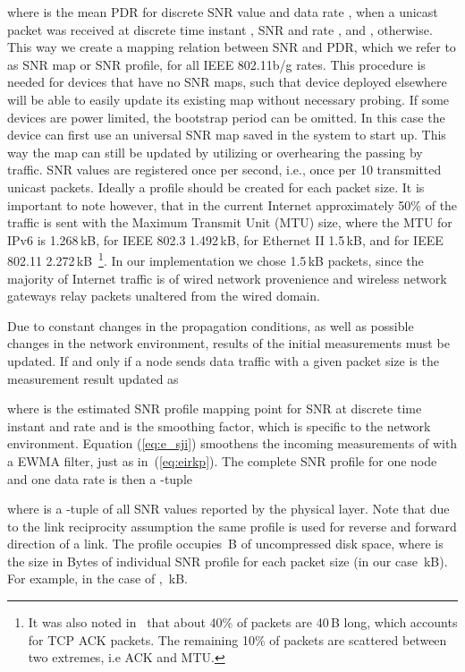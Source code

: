\documentclass[11pt,draftclsnofoot,journal,onecolumn]{IEEEtran}
\begin{document}
where  is the mean PDR for discrete SNR value  and data rate ,  when a unicast packet was received at discrete time instant , SNR  and rate , and , otherwise. This way we create a mapping relation between SNR and PDR, which we refer to as SNR map or SNR profile, for all IEEE 802.11b/g rates. This procedure is needed for devices that have no SNR maps, such that device deployed elsewhere will be able to easily update its existing map without necessary probing. If some devices are power limited, the bootstrap period can be omitted. In this case the device can first use an universal SNR map saved in the system to start up. This way the map can still be updated by utilizing or overhearing the passing by traffic. SNR values  are registered once per second, i.e., once per 10 transmitted unicast packets. Ideally a profile should be created for each packet size. It is important to note however, that in the current Internet approximately 50\% of the traffic is sent with the Maximum Transmit Unit (MTU) size, where the MTU for IPv6 is 1.268\,kB, for IEEE 802.3 1.492\,kB, for Ethernet II 1.5\,kB, and for IEEE 802.11 2.272\,kB~\cite{Williamson_ic_2001}\footnote{It was also noted in~\cite{Williamson_ic_2001} that about 40\% of packets are 40\,B long, which accounts for TCP ACK packets. The remaining 10\% of packets are scattered between two extremes, i.e ACK and MTU.}. In our implementation we chose 1.5\,kB packets, since the majority of Internet traffic is of wired network provenience and wireless network gateways relay packets unaltered from the wired domain.

Due to constant changes in the propagation conditions, as well as possible changes in the network environment, results of the initial measurements must be updated. If and only if a node sends data traffic with a given packet size is the measurement result updated as

where  is the estimated SNR profile mapping point for SNR  at discrete time instant  and rate  and  is the smoothing factor, which is specific to the network environment. Equation (\ref{eq:e_sji}) smoothens the incoming measurements of  with a EWMA filter, just as in~(\ref{eq:eirkp}). The complete SNR profile for one node and one data rate is then a -tuple

where  is a -tuple of all SNR values reported by the physical layer. Note that due to the link reciprocity assumption the same profile is used for reverse and forward direction of a link. The profile occupies \,B of uncompressed disk space, where  is the size in Bytes of individual SNR profile for each packet size (in our case \,kB). For example, in the case of , \,kB.
\end{document}
